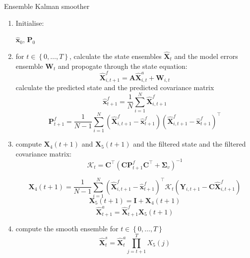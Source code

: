 \documentclass[11pt,draftcls,onecolumn,peerreview]{IEEEtran}
\begin{document}

\begin{algorithm}
\caption{Ensemble Kalman smoother}
\label{alg:EnKS}
\begin{enumerate}
\item Initialise:
\begin{center}
 $\hat{\mathbf x}_0 $, $\mathbf P_0$  
\end{center}
\item
for $t\in\left\lbrace 0, \dots, T\right\rbrace $, calculate the state ensembles $\hat{\mathbf X}_t$ and the model errors ensemble $\mathbf W_t$ and propogate through the state equation:
\begin{equation*}
\hat{\mathbf X}_{i,t+1}^f=\mathbf A \hat{\mathbf X}_{i,t}^a+\mathbf W_{i,t}
\end{equation*}
calculate the predicted state and the predicted covariance matrix
\begin{equation*}
 \hat{\mathbf x}_{t+1}^f=\frac{1}{N}\sum_{i=1}^{N}\hat{\mathbf X}_{i,t+1}^f
\end{equation*}
\begin{equation*}
 \mathbf P_{t+1}^f=\frac{1}{N-1}\sum_{i=1}^{N}\left( \hat{\mathbf X}_{i,t+1}^f- \hat{\mathbf x}_{t+1}^f\right)\left( \hat{\mathbf X}_{i,t+1}^f- \hat{\mathbf x}_{t+1}^f\right)^\top
\end{equation*}
\item
compute $\mathbf X_4(t+1)$ and $\mathbf X_5(t+1)$ and the filtered state and the filtered covariance matrix:
\begin{equation*}
 \mathcal K_t=\mathbf C^{\top}(\mathbf C\mathbf{P}_{t+1}^f\mathbf C^{\top}+\boldsymbol\Sigma_v)^{-1}
\end{equation*}

\begin{equation*}
 \mathbf X_4(t+1)=\frac{1}{N-1}\sum_{i=1}^{N}(\hat{\mathbf X}_{i,t+1}^f-\hat{\mathbf x}^f_{t+1} )^\top\mathcal K_t (\mathbf Y_{i,t+1}-\mathbf C\hat{\mathbf{X}}_{i,t+1}^f)
\end{equation*}
\begin{equation*}
 \mathbf X_5(t+1)= \mathbf I +\mathbf X_4(t+1)
\end{equation*}
\begin{equation*}
 \hat{\mathbf X}_{t+1}^a=\hat{\mathbf X}_{t+1}^f \mathbf X_5(t+1)
\end{equation*}
\item compute the smooth ensemble for $t\in\left\lbrace 0, \dots, T\right\rbrace $
\begin{equation*}
 \hat{\mathbf{X}}_{t}^s=\hat{\mathbf X}_{t}^a \prod_{j=t+1}^{T}X_5(j)
\end{equation*}
\end{enumerate}
\end{algorithm}
\end{document}
